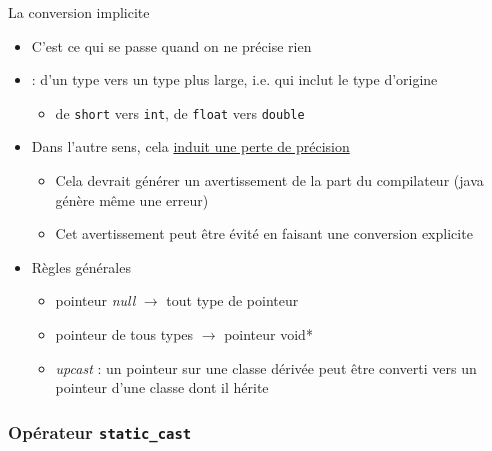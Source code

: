 \begin{frame}{La conversion implicite}
\begin{itemize}
\item C'est ce qui se passe quand on ne précise rien
\item {} : d'un type vers un type plus large, i.e. qui inclut le type d'origine
\begin{itemize}
\item de \texttt{short} vers \texttt{int}, de \texttt{float} vers \texttt{double}
\end{itemize}
\item Dans l'autre sens, cela \underline{induit une perte de précision}
\begin{itemize}
\item Cela devrait générer un avertissement de la part du compilateur (java génère même une erreur)
\item Cet avertissement peut être évité en faisant une conversion explicite
\end{itemize}
\item Règles générales
\begin{itemize}
\item  pointeur \textit{null} $\longrightarrow$ tout type de pointeur
\item  pointeur de tous types $\longrightarrow$ pointeur void*
\item \textit{upcast} : un pointeur sur une classe dérivée peut être converti vers un pointeur d'une classe dont il hérite
\end{itemize}
\end{itemize}
\end{frame}
\subsubsection{Opérateur \texttt{static\_cast}}

